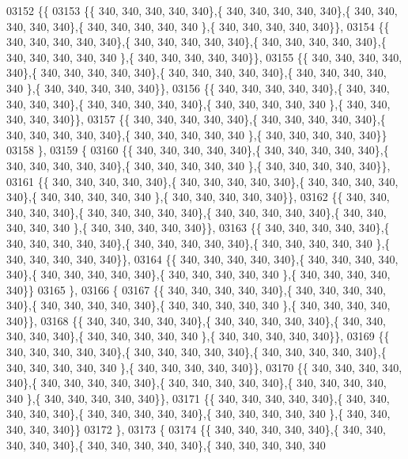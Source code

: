 \begin{DoxyCode}
03152 \{\{
03153 \{\{ 340, 340, 340, 340, 340\},\{ 340, 340, 340, 340, 340\},\{ 340, 340, 340, 340, 340\},\{ 340, 340, 340, 340, 340
      \},\{ 340, 340, 340, 340, 340\}\},
03154 \{\{ 340, 340, 340, 340, 340\},\{ 340, 340, 340, 340, 340\},\{ 340, 340, 340, 340, 340\},\{ 340, 340, 340, 340, 340
      \},\{ 340, 340, 340, 340, 340\}\},
03155 \{\{ 340, 340, 340, 340, 340\},\{ 340, 340, 340, 340, 340\},\{ 340, 340, 340, 340, 340\},\{ 340, 340, 340, 340, 340
      \},\{ 340, 340, 340, 340, 340\}\},
03156 \{\{ 340, 340, 340, 340, 340\},\{ 340, 340, 340, 340, 340\},\{ 340, 340, 340, 340, 340\},\{ 340, 340, 340, 340, 340
      \},\{ 340, 340, 340, 340, 340\}\},
03157 \{\{ 340, 340, 340, 340, 340\},\{ 340, 340, 340, 340, 340\},\{ 340, 340, 340, 340, 340\},\{ 340, 340, 340, 340, 340
      \},\{ 340, 340, 340, 340, 340\}\}
03158 \},
03159 \{
03160 \{\{ 340, 340, 340, 340, 340\},\{ 340, 340, 340, 340, 340\},\{ 340, 340, 340, 340, 340\},\{ 340, 340, 340, 340, 340
      \},\{ 340, 340, 340, 340, 340\}\},
03161 \{\{ 340, 340, 340, 340, 340\},\{ 340, 340, 340, 340, 340\},\{ 340, 340, 340, 340, 340\},\{ 340, 340, 340, 340, 340
      \},\{ 340, 340, 340, 340, 340\}\},
03162 \{\{ 340, 340, 340, 340, 340\},\{ 340, 340, 340, 340, 340\},\{ 340, 340, 340, 340, 340\},\{ 340, 340, 340, 340, 340
      \},\{ 340, 340, 340, 340, 340\}\},
03163 \{\{ 340, 340, 340, 340, 340\},\{ 340, 340, 340, 340, 340\},\{ 340, 340, 340, 340, 340\},\{ 340, 340, 340, 340, 340
      \},\{ 340, 340, 340, 340, 340\}\},
03164 \{\{ 340, 340, 340, 340, 340\},\{ 340, 340, 340, 340, 340\},\{ 340, 340, 340, 340, 340\},\{ 340, 340, 340, 340, 340
      \},\{ 340, 340, 340, 340, 340\}\}
03165 \},
03166 \{
03167 \{\{ 340, 340, 340, 340, 340\},\{ 340, 340, 340, 340, 340\},\{ 340, 340, 340, 340, 340\},\{ 340, 340, 340, 340, 340
      \},\{ 340, 340, 340, 340, 340\}\},
03168 \{\{ 340, 340, 340, 340, 340\},\{ 340, 340, 340, 340, 340\},\{ 340, 340, 340, 340, 340\},\{ 340, 340, 340, 340, 340
      \},\{ 340, 340, 340, 340, 340\}\},
03169 \{\{ 340, 340, 340, 340, 340\},\{ 340, 340, 340, 340, 340\},\{ 340, 340, 340, 340, 340\},\{ 340, 340, 340, 340, 340
      \},\{ 340, 340, 340, 340, 340\}\},
03170 \{\{ 340, 340, 340, 340, 340\},\{ 340, 340, 340, 340, 340\},\{ 340, 340, 340, 340, 340\},\{ 340, 340, 340, 340, 340
      \},\{ 340, 340, 340, 340, 340\}\},
03171 \{\{ 340, 340, 340, 340, 340\},\{ 340, 340, 340, 340, 340\},\{ 340, 340, 340, 340, 340\},\{ 340, 340, 340, 340, 340
      \},\{ 340, 340, 340, 340, 340\}\}
03172 \},
03173 \{
03174 \{\{ 340, 340, 340, 340, 340\},\{ 340, 340, 340, 340, 340\},\{ 340, 340, 340, 340, 340\},\{ 340, 340, 340, 340, 340

\end{DoxyCode}
